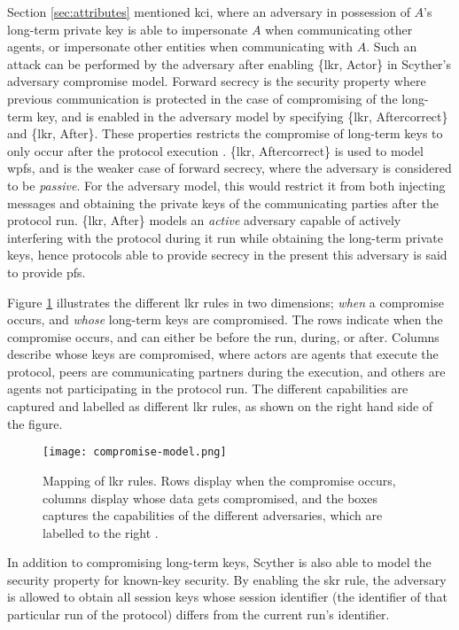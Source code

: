 Section \ref{sec:attributes} mentioned \gls{kci}, where an adversary in possession of $A$'s long-term private key is able to impersonate $A$ when communicating other agents, or impersonate other entities when communicating with $A$. Such an attack can be performed by the adversary after enabling \{\gls{lkr}, Actor\} in Scyther's adversary compromise model. Forward secrecy is the security property where previous communication is protected in the case of compromising of the long-term key, and is enabled in the adversary model by specifying \{\gls{lkr}, Aftercorrect\} and \{\gls{lkr}, After\}. These properties restricts the compromise of long-term keys to only occur after the protocol execution \cite{basin2010modeling}. \{\gls{lkr}, Aftercorrect\} is used to model \gls{wpfs}, and is the weaker case of forward secrecy, where the adversary is considered to be \emph{passive}. For the adversary model, this would restrict it from both injecting messages and obtaining the private keys of the communicating parties after the protocol run.  \{\gls{lkr}, After\} models an \emph{active} adversary capable of actively interfering with the protocol during it run while obtaining the long-term private keys, hence protocols able to provide secrecy in the present this adversary is said to provide \gls{pfs}. 



Figure \ref{fig:compromise-model} illustrates the different \gls{lkr} rules in two dimensions; \emph{when} a compromise occurs, and \emph{whose} long-term keys are compromised. The rows indicate when the compromise occurs, and can either be before the run, during, or after. Columns describe whose keys are compromised, where actors are agents that execute the protocol, peers are communicating partners during the execution, and others are agents not participating in the protocol run. The different capabilities are captured and labelled as different \gls{lkr} rules, as shown on the right hand side of the figure. 

\begin{figure}
	\centering
	\texttt{[image: compromise-model.png]}
	\caption{Mapping of \gls{lkr} rules. Rows display when the compromise occurs, columns display whose data gets compromised, and the boxes captures the capabilities of the different adversaries, which are labelled to the right \cite{basin2010modeling}.}
	\label{fig:compromise-model}
\end{figure}


In addition to compromising long-term keys, Scyther is also able to model the security property for known-key security. By enabling the \gls{skr} rule, the adversary is allowed to obtain all session keys whose session identifier (the identifier of that particular run of the protocol) differs from the current run's identifier.


